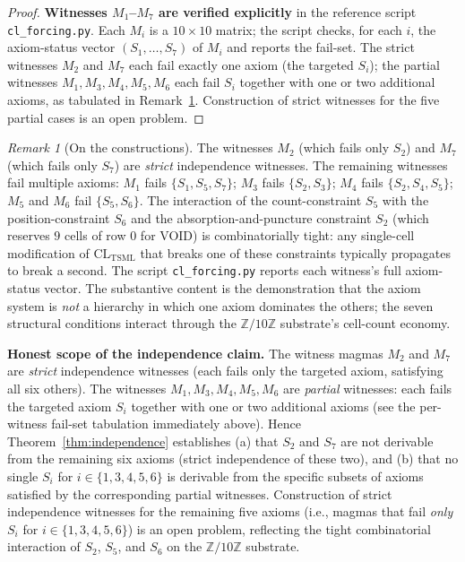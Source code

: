\documentclass[11pt,reqno]{amsart}
\theoremstyle{plain}
\theoremstyle{definition}
\theoremstyle{remark}
\newtheorem*{remark}{Remark}
\newcommand{\Z}{\mathbb{Z}}
\newcommand{\TSML}{\mathrm{TSML}}
\newcommand{\CL}{\mathrm{CL}}
\begin{document}
\begin{proof}
\smallskip
\noindent\textbf{Witnesses $M_{1}$--$M_{7}$ are verified explicitly}
in the reference script \texttt{cl\_forcing.py}. Each $M_{i}$
is a $10 \times 10$ matrix; the script checks, for each $i$, the
axiom-status vector $(S_{1}, \ldots, S_{7})$ of $M_{i}$ and reports
the fail-set. The strict witnesses $M_{2}$ and $M_{7}$ each fail
exactly one axiom (the targeted $S_{i}$); the partial witnesses
$M_{1}, M_{3}, M_{4}, M_{5}, M_{6}$ each fail $S_{i}$ together with
one or two additional axioms, as tabulated in
Remark~\ref{rem:partial-witnesses}. Construction of strict witnesses
for the five partial cases is an open problem.
\end{proof}

\begin{remark}[On the constructions]
\label{rem:partial-witnesses}
The witnesses $M_{2}$ (which fails only $S_{2}$) and $M_{7}$ (which
fails only $S_{7}$) are \emph{strict} independence witnesses. The
remaining witnesses fail multiple axioms: $M_{1}$ fails
$\{S_{1}, S_{5}, S_{7}\}$; $M_{3}$ fails $\{S_{2}, S_{3}\}$; $M_{4}$
fails $\{S_{2}, S_{4}, S_{5}\}$; $M_{5}$ and $M_{6}$ fail
$\{S_{5}, S_{6}\}$. The interaction of the count-constraint $S_{5}$
with the position-constraint $S_{6}$ and the absorption-and-puncture
constraint $S_{2}$ (which reserves $9$ cells of row $0$ for VOID) is
combinatorially tight: any single-cell modification of
$\CL_{\TSML}$ that breaks one of these constraints typically
propagates to break a second. The script
\texttt{cl\_forcing.py} reports each witness's full axiom-status
vector. The substantive content is the demonstration that the
axiom system is \emph{not} a hierarchy in which one axiom dominates
the others; the seven structural conditions interact through the
$\Z/10\Z$ substrate's cell-count economy.

\smallskip
\noindent\textbf{Honest scope of the independence claim.} The
witness magmas $M_{2}$ and $M_{7}$ are \emph{strict} independence
witnesses (each fails only the targeted axiom, satisfying all six
others). The witnesses $M_{1}, M_{3}, M_{4}, M_{5}, M_{6}$ are
\emph{partial} witnesses: each fails the targeted axiom $S_{i}$
together with one or two additional axioms (see the per-witness
fail-set tabulation immediately above). Hence Theorem~\ref{thm:independence}
establishes (a) that $S_{2}$ and $S_{7}$ are not derivable from the
remaining six axioms (strict independence of these two), and
(b) that no single $S_{i}$ for $i \in \{1, 3, 4, 5, 6\}$ is
derivable from the specific subsets of axioms satisfied by the
corresponding partial witnesses. Construction of strict
independence witnesses for the remaining five axioms (i.e., magmas
that fail \emph{only} $S_{i}$ for $i \in \{1, 3, 4, 5, 6\}$) is an
open problem, reflecting the tight combinatorial interaction of
$S_{2}$, $S_{5}$, and $S_{6}$ on the $\Z/10\Z$ substrate.
\end{remark}
\end{document}
